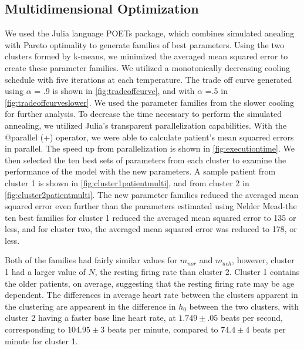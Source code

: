 \documentclass[fleqn,10pt]{wlscirep}
\begin{document}
\subsection*{Multidimensional Optimization}
We used the Julia language POETs package, which combines simulated anealing with Pareto optimality to generate families of best parameters.\cite{bassen2016jupoets} Using the two clusters formed by k-means, we minimized the averaged mean squared error to create these parameter families. We utilized a monotonically decreasing cooling schedule with five iterations at each temperature. The trade off curve generated using $\alpha$ = .9 is shown in \ref{fig:tradeoffcurve}, and with $\alpha$ =.5  in \ref{fig:tradeoffcurveslower}. We used the parameter families from the slower cooling for further analysis. 
To decrease the time necessary to perform the simulated annealing, we utilized Julia's transparent parallelization capabilities. With the @parallel (+) operator, we were able to calculate patient's mean squarred errors in parallel. The speed up from parallelization is shown in \ref{fig:executiontime}. 
We then selected the ten best sets of parameters from each cluster to examine the performance of the model with the new parameters. A sample patient from cluster 1 is shown in \ref{fig:cluster1patientmulti}, and from cluster 2 in \ref{fig:cluster2patientmulti}. The new parameter families reduced the averaged mean squared error even further than the parameters estimated using Nelder Mead-the ten best families for cluster 1 reduced the averaged mean squared error to 135 or less, and for cluster two, the averaged mean squared error was reduced to 178, or less. 

Both of the families had fairly similar values for $m_{nor}$ and $m_{ach}$, however, cluster 1 had a larger value of $N$, the resting firing rate than cluster 2. Cluster 1 contains the older patients, on average, suggesting that the resting firing rate may be age dependent. The differences in average heart rate between the clusters apparent in the clustering are appearent in the difference in $h_0$ between the two clusters, with cluster 2 having a faster base line heart rate, at $1.749 \pm .05$ beats per second, corresponding to $104.95 \pm 3$ beats per minute, compared to $74.4 \pm 4$ beats per minute for cluster 1.
 
\end{document}

